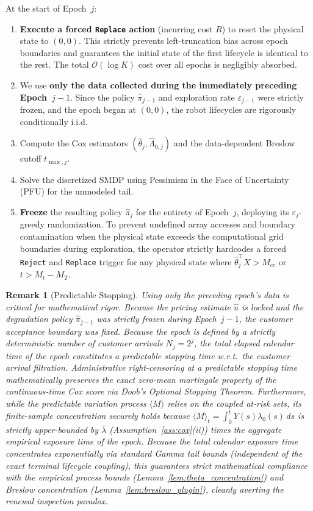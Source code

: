 \documentclass[letterpaper, 10 pt, conference]{IEEEconf}
\newtheorem{remark}{Remark}
\newcommand{\what}[1]{\widehat{#1}}
\begin{document}
At the start of Epoch~$j$:
\begin{enumerate}
    \item \textbf{Execute a forced \texttt{Replace} action} (incurring cost $R$) to reset the physical state to $(0,0)$. This strictly prevents left-truncation bias across epoch boundaries and guarantees the initial state of the first lifecycle is identical to the rest. The total $\mathcal{O}(\log K)$ cost over all epochs is negligibly absorbed.
    \item We use \textbf{only the data collected during the immediately preceding Epoch~$j-1$}. Since the policy $\what{\pi}_{j-1}$ and exploration rate $\varepsilon_{j-1}$ were strictly frozen, and the epoch began at $(0,0)$, the robot lifecycles are rigorously conditionally i.i.d.
    \item Compute the Cox estimators $(\what{\theta}_j, \what{\Lambda}_{0,j})$ and the data-dependent Breslow cutoff $t_{\max,j}$.
    \item Solve the discretized SMDP using Pessimism in the Face of Uncertainty (PFU) for the unmodeled tail.
    \item \textbf{Freeze} the resulting policy $\what{\pi}_j$ for the entirety of Epoch~$j$, deploying its $\varepsilon_j$-greedy randomization. To prevent undefined array accesses and boundary contamination when the physical state exceeds the computational grid boundaries during exploration, the operator strictly hardcodes a forced \texttt{Reject} and \texttt{Replace} trigger for any physical state where $\what{\theta}_j^\top X > M_{cc}$ or $t > M_t - M_T$.
\end{enumerate}

\begin{remark}[Predictable Stopping]
    \label{rem:stationarity}
    Using only the preceding epoch's data is critical for mathematical rigor. Because the pricing estimate $\what{u}$ is locked and the degradation policy $\what{\pi}_{j-1}$ was strictly frozen during Epoch~$j-1$, the customer acceptance boundary was fixed. Because the epoch is defined by a strictly deterministic number of customer arrivals $N_j = 2^j$, the total elapsed calendar time of the epoch constitutes a predictable stopping time w.r.t.\ the customer arrival filtration. Administrative right-censoring at a predictable stopping time mathematically preserves the exact zero-mean martingale property of the continuous-time Cox score via Doob's Optional Stopping Theorem. Furthermore, while the predictable variation process $\langle M \rangle$ relies on the coupled at-risk sets, its finite-sample concentration securely holds because $\langle M \rangle_t = \int_0^t Y(s) \lambda_0(s)\,ds$ is strictly upper-bounded by $\overline{\lambda}$ (Assumption~\ref{ass:cox}(ii)) times the aggregate empirical exposure time of the epoch. Because the total calendar exposure time concentrates exponentially via standard Gamma tail bounds (independent of the exact terminal lifecycle coupling), this guarantees strict mathematical compliance with the empirical process bounds (Lemma~\ref{lem:theta_concentration}) and Breslow concentration (Lemma~\ref{lem:breslow_plugin}), cleanly averting the renewal inspection paradox.
\end{remark}
\end{document}
